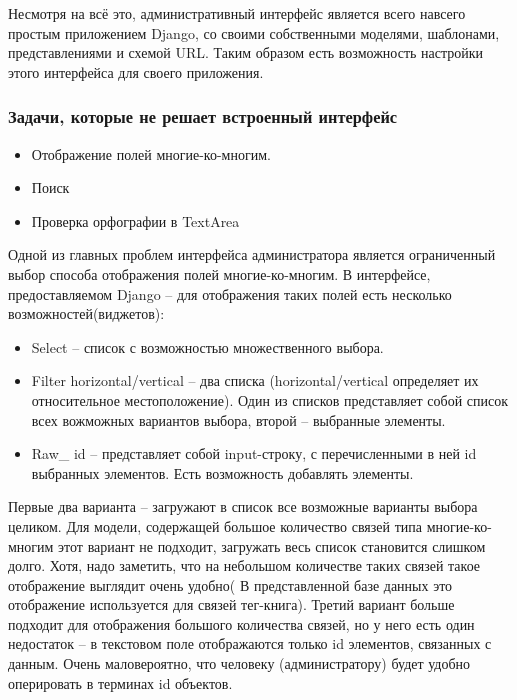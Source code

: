 \documentclass[a4paper]{report}
\begin{document}
Несмотря на всё это, административный интерфейс является всего навсего простым приложением Django, со своими собственными моделями, шаблонами, представлениями и схемой URL. Таким образом есть возможность настройки этого интерфейса для своего приложения.

\subsubsection{Задачи, которые не решает встроенный интерфейс}
\begin{itemize}
	\item Отображение полей многие-ко-многим.
	\item Поиск
	\item Проверка орфографии в TextArea
\end{itemize}

Одной из главных проблем интерфейса администратора является ограниченный выбор способа отображения полей многие-ко-многим. В интерфейсе, предоставляемом Django -- для отображения таких полей есть несколько возможностей(виджетов):
\begin{itemize}
	\item Select -- список с возможностью множественного выбора.
	\item Filter horizontal/vertical -- два списка (horizontal/vertical определяет их относительное местоположение). Один из списков представляет собой список всех вожможных вариантов выбора, второй -- выбранные элементы.
	\item Raw\_ id -- представляет собой input-строку, с перечисленными в ней id выбранных элементов. Есть возможность добавлять элементы.
\end{itemize}
Первые два варианта -- загружают в список все возможные варианты выбора целиком. Для модели, содержащей большое количество связей типа многие-ко-многим этот вариант не подходит, \tk загружать весь список становится слишком долго. Хотя, надо заметить, что на небольшом количестве таких связей такое отображение выглядит очень удобно( В представленной базе данных это отображение используется для связей тег-книга). 
Третий вариант больше подходит для отображения большого количества связей, но у него есть один недостаток -- в текстовом поле отображаются только id элементов, связанных с данным. Очень маловероятно, что человеку (администратору) будет удобно оперировать в терминах id объектов.
\end{document}
